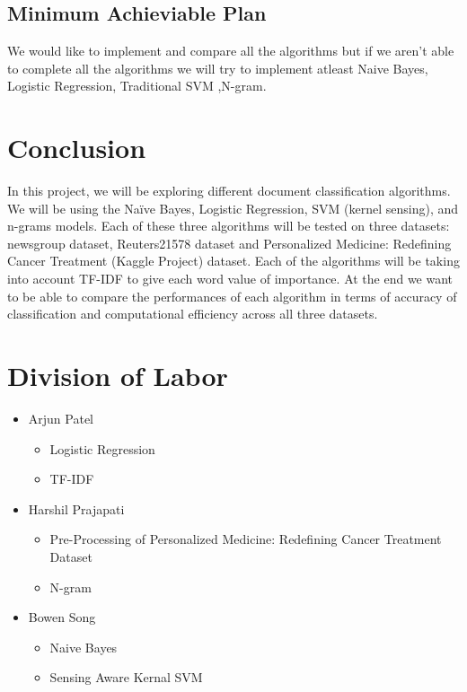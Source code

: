\documentclass[a4paper, 11pt]{article}
\begin{document}
	\subsection{Minimum Achieviable Plan}
	We would like to implement and compare all the algorithms but if we aren't able to complete all the algorithms we will try to implement atleast Naive Bayes, Logistic Regression, Traditional SVM ,N-gram.
	
	\section{Conclusion}
	In this project, we will be exploring different document classification algorithms. We will be using the Naïve Bayes, Logistic Regression, SVM (kernel sensing), and n-grams models. Each of these three algorithms will be tested on three datasets: newsgroup dataset, Reuters21578 dataset and Personalized Medicine: Redefining Cancer Treatment (Kaggle Project) dataset. Each of the algorithms will be taking into account TF-IDF to give each word value of importance. At the end we want to be able to compare the performances of each algorithm in terms of accuracy of classification and computational efficiency across all three datasets. 
	
	\section*{Division of Labor}
	\begin{itemize}
		\item  Arjun Patel
		\begin{itemize}
			\item Logistic Regression
			\item TF-IDF
		\end{itemize}
		\item  Harshil Prajapati
		\begin{itemize}
			\item Pre-Processing of Personalized Medicine: Redefining Cancer Treatment Dataset
			\item N-gram
		\end{itemize}
		\item Bowen Song
		\begin{itemize}
			\item Naive Bayes 
			\item Sensing Aware Kernal SVM
		\end{itemize}
	\end{itemize}
	
	
	\nocite{*}
	{\small
		
		
	}
\end{document}
